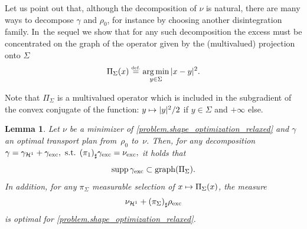 \documentclass[JEP,XML,SOM,Unicode,NoFloatCountersInSection,published]{cedram}
\newcommand\mto{\mathchoice{\longmapsto}{\mapsto}{\mapsto}{\mapsto}}
\newtheorem{lemma}[theorem]{Lemma}
\theoremstyle{definition}
\newcommand{\eqdef}{\ensuremath{\stackrel{\mbox{\upshape\tiny def.}}{=}}}
\newcommand\cH{\mathcal{H}}
\DeclareMathOperator*{\argmin}{arg\,min}
\DeclareMathOperator{\supp}{supp}
\newcommand{\nuexc}{\nu_{\textup{exc}}}
\newcommand{\nuH}{\nu_{\cH^1}}
\newcommand{\rhoexc}{\rho_{\textup{exc}}}
\newcommand{\gammaexc}{\gamma_{\textup{exc}}}
\newcommand{\gammaH}{\gamma_{\cH^1}}
\begin{document}
Let us point out that, although the decomposition of $\nu$ is natural, there are many ways to decompose $\gamma$ and $\rho_0$, for instance by choosing another disintegration family. In~the sequel we show that for any such decomposition the excess must be concentrated on the graph of the operator given by the (multivalued) projection onto $\Sigma$
\begin{equation}\label{projection_operator}
\Pi_\Sigma(x) \eqdef \argmin_{y \in \Sigma} |x - y|^2.
\end{equation}

Note that $\Pi_\Sigma$ is a multivalued operator which is included in the subgradient of the convex conjugate of the function:
$y\mto |y|^2/2$ if $y\in \Sigma$ and $+\infty$ else.
\begin{lemma}\label{lemma.minimal_distance2Sigma}
Let $\nu$ be a minimizer of \eqref{problem.shape_optimization_relaxed} and $\gamma$ an optimal transport plan from~$\rho_0$ to~$\nu$. Then, for any decomposition
$
\gamma =
\gammaH+ \gammaexc,
\text{ s.t. }
{(\pi_{1})}_\sharp \gammaexc = \nuexc,
$
it holds that\vspace*{-3pt}
\begin{equation}
\supp \gammaexc \subset \mathrm{graph}(\Pi_\Sigma).\label{eqgammaexcproj}
\end{equation}
In addition, for any $\pi_\Sigma$ measurable selection of $x\mto \Pi_\Sigma(x)$, the measure\vspace*{-3pt}
\[
\nuH + {(\pi_{\Sigma})}_\sharp\rhoexc
\]
is optimal for \eqref{problem.shape_optimization_relaxed}.
\end{lemma}
\end{document}
